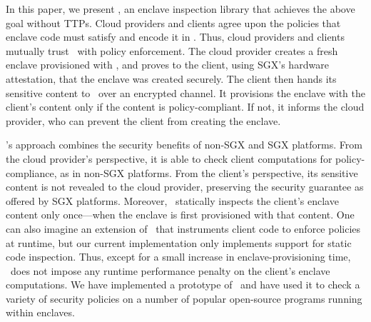  In this paper, we present \tool, an enclave
inspection library that achieves the above goal without TTPs.  Cloud providers
and clients agree upon the policies that enclave code must satisfy and encode
it in \tool. Thus, cloud providers and clients mutually trust \tool\ with
policy enforcement. The cloud provider creates a fresh enclave provisioned with
\tool, and proves to the client, using SGX's hardware attestation, that the
enclave was created securely. The client then hands its sensitive content to
\tool\ over an encrypted channel. It provisions the enclave with the client's
content only if the content is policy-compliant. If not, it informs the cloud
provider, who can prevent the client from creating the enclave. 

\tool's approach combines the security benefits of non-SGX and SGX platforms.
From the cloud provider's perspective, it is able to check client computations
for policy-compliance, as in non-SGX platforms. From the client's perspective,
its sensitive content is not revealed to the cloud provider, preserving the
security guarantee as offered by SGX platforms. Moreover, \tool\ statically
inspects the client's enclave content only once---when the enclave is first
provisioned with that content. One can also imagine an extension of \tool\ that
instruments client code to enforce policies at runtime, but our current
implementation only implements support for static code inspection.  Thus,
except for a small increase in enclave-provisioning time, \tool\ does not
impose any runtime performance penalty on the client's enclave computations.
We have implemented a prototype of \tool\ and have used it to check a variety
of security policies on a number of popular open-source programs running within
enclaves.
